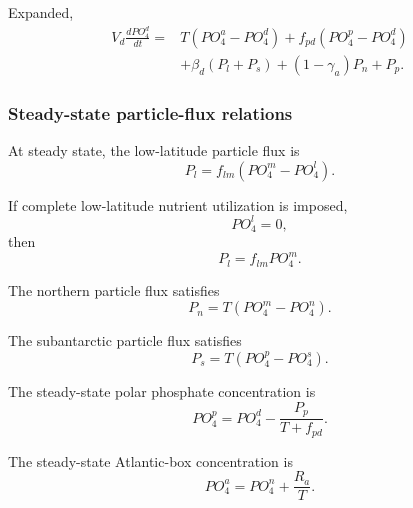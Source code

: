 \documentclass[11pt]{article}
\begin{document}
Expanded,
\begin{equation}
\begin{split}
V_d\frac{dPO_4^d}{dt}
={}&
T
\left(
PO_4^a-PO_4^d
\right)
+
f_{pd}
\left(
PO_4^p-PO_4^d
\right)
\\
&+
\beta_d
\left(
P_l+P_s
\right)
+
\left(1-\gamma_a\right)P_n
+
P_p.
\end{split}
\label{eq:seven_po4_d_expanded}
\end{equation}

\subsubsection{Steady-state particle-flux relations}

At steady state, the low-latitude particle flux is
\begin{equation}
P_l
=
f_{lm}
\left(
PO_4^m-PO_4^l
\right).
\label{eq:seven_Pl_steady}
\end{equation}

If complete low-latitude nutrient utilization is imposed,
\begin{equation}
PO_4^l=0,
\label{eq:seven_po4_l_zero}
\end{equation}
then
\begin{equation}
P_l=f_{lm}PO_4^m.
\label{eq:seven_Pl_constraint}
\end{equation}

The northern particle flux satisfies
\begin{equation}
P_n
=
T
\left(
PO_4^m-PO_4^n
\right).
\label{eq:seven_Pn_steady}
\end{equation}

The subantarctic particle flux satisfies
\begin{equation}
P_s
=
T
\left(
PO_4^p-PO_4^s
\right).
\label{eq:seven_Ps_steady}
\end{equation}

The steady-state polar phosphate concentration is
\begin{equation}
PO_4^p
=
PO_4^d
-
\frac{P_p}{T+f_{pd}}.
\label{eq:seven_po4_p_steady}
\end{equation}

The steady-state Atlantic-box concentration is
\begin{equation}
PO_4^a
=
PO_4^n
+
\frac{R_a}{T}.
\label{eq:seven_po4_a_steady}
\end{equation}
\end{document}
